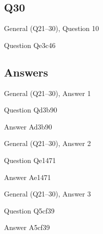 \documentclass[11pt]{beamer}
\begin{document}
\subsection*{Q30}
\begin{frame}[t]{General (Q21--30), Question 10}
\vspace{2em}
\begin{block}{Question}
Qe3c46
\end{block}
\begin{center}


\end{center}
\end{frame}
    
\subsection{Answers}

\begin{frame}[t]{General (Q21--30), Answer 1}
\vspace{2em}
\begin{block}{Question}
Qd3b90
\end{block}
\pause{}
\begin{block}{Answer}
Ad3b90
\end{block}
\end{frame}
    

\begin{frame}[t]{General (Q21--30), Answer 2}
\vspace{2em}
\begin{block}{Question}
Qe1471
\end{block}
\pause{}
\begin{block}{Answer}
Ae1471
\end{block}
\end{frame}
    

\begin{frame}[t]{General (Q21--30), Answer 3}
\vspace{2em}
\begin{block}{Question}
Q5cf39
\end{block}
\pause{}
\begin{block}{Answer}
A5cf39
\end{block}
\end{frame}
    
\end{document}
